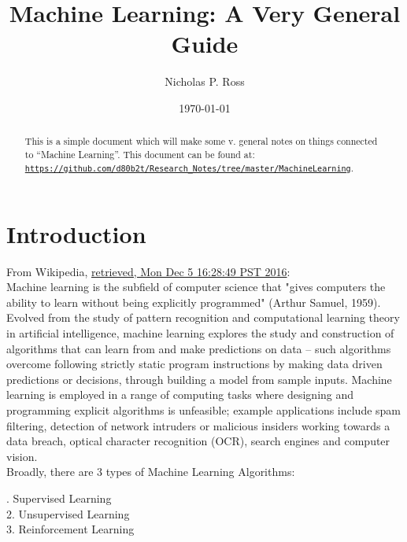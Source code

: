 \documentclass[11pt]{article}
\begin{document}
\title{Machine Learning: A Very General Guide}
\author{Nicholas P. Ross}
\date{\today}
\maketitle


\begin{abstract}
This is a simple document which will make some v. general notes on 
things connected to ``Machine Learning''. This document can be found at:\\
\href{https://github.com/d80b2t/Research_Notes/tree/master/MachineLearning}{\tt https://github.com/d80b2t/Research\_Notes/tree/master/MachineLearning}. 
\end{abstract}




\section{Introduction}
From Wikipedia,  
\href{https://en.wikipedia.org/w/index.php?title=Machine_learning&oldid=753193210}{retrieved, Mon Dec  5 16:28:49 PST 2016}: \\

Machine learning is the subfield of computer science that "gives
computers the ability to learn without being explicitly programmed"
(Arthur Samuel, 1959). Evolved from the study of pattern recognition
and computational learning theory in artificial intelligence, machine
learning explores the study and construction of algorithms that can
learn from and make predictions on data – such algorithms overcome
following strictly static program instructions by making data driven
predictions or decisions, through building a model from sample
inputs. Machine learning is employed in a range of computing tasks
where designing and programming explicit algorithms is unfeasible;
example applications include spam filtering, detection of network
intruders or malicious insiders working towards a data breach, optical
character recognition (OCR), search engines and computer vision.\\


\smallskip \smallskip
\noindet
Broadly, there are 3 types of Machine Learning Algorithms:

. Supervised Learning\\
2. Unsupervised Learning\\
3. Reinforcement Learning\\
\end{document}
